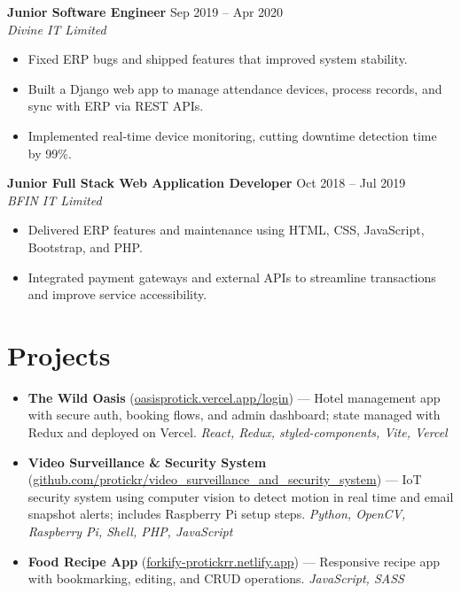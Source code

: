 \documentclass[a4paper,10pt]{article}
\begin{document}
\vspace{1pt}

\textbf{Junior Software Engineer} \hfill Sep 2019 -- Apr 2020\\[-2pt]
\textit{Divine IT Limited}\\[-4pt]
\begin{itemize}
  \item Fixed ERP bugs and shipped features that improved system stability.
  \item Built a Django web app to manage attendance devices, process records, and sync with ERP via REST APIs.
  \item Implemented real-time device monitoring, cutting downtime detection time by 99\%.
\end{itemize}

\vspace{1pt}

\textbf{Junior Full Stack Web Application Developer} \hfill Oct 2018 -- Jul 2019\\[-2pt]
\textit{BFIN IT Limited}\\[-4pt]
\begin{itemize}
  \item Delivered ERP features and maintenance using HTML, CSS, JavaScript, Bootstrap, and PHP.
  \item Integrated payment gateways and external APIs to streamline transactions and improve service accessibility.
\end{itemize}

\section*{Projects}
\begin{itemize}
  \item \textbf{The Wild Oasis} (\href{https://oasisprotick.vercel.app/login}{oasisprotick.vercel.app/login}) --- Hotel management app with secure auth, booking flows, and admin dashboard; state managed with Redux and deployed on Vercel. \emph{React, Redux, styled-components, Vite, Vercel}
  \item \textbf{Video Surveillance \& Security System} (\href{https://github.com/protickr/video_surveillance_and_security_system}{github.com/protickr/video\_surveillance\_and\_security\_system}) --- IoT security system using computer vision to detect motion in real time and email snapshot alerts; includes Raspberry Pi setup steps. \emph{Python, OpenCV, Raspberry Pi, Shell, PHP, JavaScript}
  \item \textbf{Food Recipe App} (\href{https://forkify-protickrr.netlify.app}{forkify-protickrr.netlify.app}) --- Responsive recipe app with bookmarking, editing, and CRUD operations. \emph{JavaScript, SASS}
\end{itemize}
\end{document}
